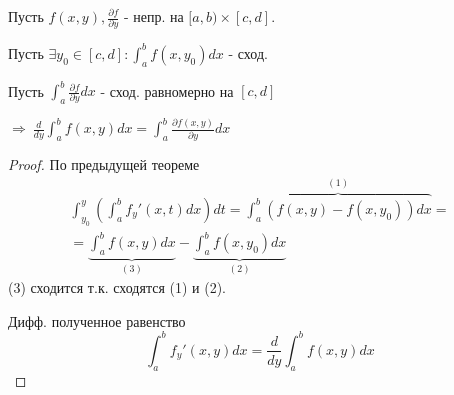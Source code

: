 \documentclass{article}
\theoremstyle{definition}
\numberwithin{theorem}{section}
\numberwithin{lemma}{section}
\numberwithin{definition}{section}
\numberwithin{corollary}{section}
\numberwithin{equation}{section}
\let\implies\Rightarrow
\newcommand{\pd}[2]{\frac{\partial{#1}}{\partial{#2}}}
\begin{document}
\begin{theorem}
  \phantom{.}

  Пусть $f(x,y), \pd{f}{y}$ - непр. на $[a,b)\times [c,d]$.

  Пусть $\exists y_0 \in [c,d]: \int_{a}^{b}f(x,y_0)dx$ - сход.

  Пусть $\int_{a}^{b}\pd{f}{y}dx$ - сход. равномерно на $[c,d]$

  $\implies \ \frac{d}{dy}\int_{a}^{b}f(x,y)dx=\int_{a}^{b}\pd{f(x,y)}{y}dx$
\end{theorem}
\begin{proof}
  По предыдущей теореме
  \begin{gather*}
    \int_{y_0}^{y}(\int_{a}^{b}f_y'(x,t)dx)dt=\overbrace{\int_{a}^{b}(f(x,y)-f(x,y_0))dx}^{(1)} = \\ 
    =\underbrace{\int_{a}^{b}f(x,y)dx}_{(3)} - \underbrace{\int_{a}^{b}f(x,y_0)dx}_{(2)}
  \end{gather*}
  (3) сходится т.к. сходятся (1) и (2).
  
  Дифф. полученное равенство
  \[
    \int_{a}^{b}f_y'(x,y)dx=\frac{d}{dy}\int_{a}^{b}f(x,y)dx
  \]
\end{proof}
\end{document}
